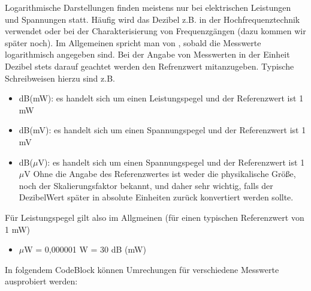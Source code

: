 \documentclass[letterpaper,10pt,english]{jupyterBook}
\begin{document}
\sphinxAtStartPar
Logarithmische Darstellungen finden meistens nur bei elektrischen Leistungen und Spannungen statt. Häufig wird das Dezibel z.B. in der Hochfrequenztechnik verwendet oder bei der Charakterisierung von Frequenzgängen (dazu kommen wir später noch). Im Allgemeinen spricht man von , sobald die Messwerte logarithmisch angegeben sind. Bei der Angabe von Messwerten in der Einheit Dezibel  stets darauf geachtet werden den Refrenzwert mitanzugeben. Typische Schreibweisen hierzu sind z.B.
\begin{itemize}
\item {} 
\sphinxAtStartPar
dB(mW): es handelt sich um einen Leistungspegel und der Referenzwert ist 1 mW

\item {} 
\sphinxAtStartPar
dB(mV): es handelt sich um einen Spannungspegel und der Referenzwert ist 1 mV

\item {} 
\sphinxAtStartPar
dB(\(\mu\)V): es handelt sich um einen Spannungspegel und der Referenzwert ist 1 \(\mu\)V
Ohne die Angabe des Referenzwertes ist weder die physikalische Größe, noch der Skalierungsfaktor bekannt, und daher sehr wichtig, falls der Dezibel\sphinxhyphen{}Wert später in absolute Einheiten zurück konvertiert werden sollte.

\end{itemize}

\sphinxAtStartPar
Für Leistungspegel gilt also im Allgmeinen (für einen typischen Referenzwert von 1 mW)
\begin{itemize}
\item {} 
 \(\mu\)W = 0,000001 W = \sphinxhyphen{}30 dB (mW)

\end{itemize}

\sphinxAtStartPar
In folgendem Code\sphinxhyphen{}Block können Umrechungen für verschiedene Messwerte ausprobiert werden:
\end{document}
